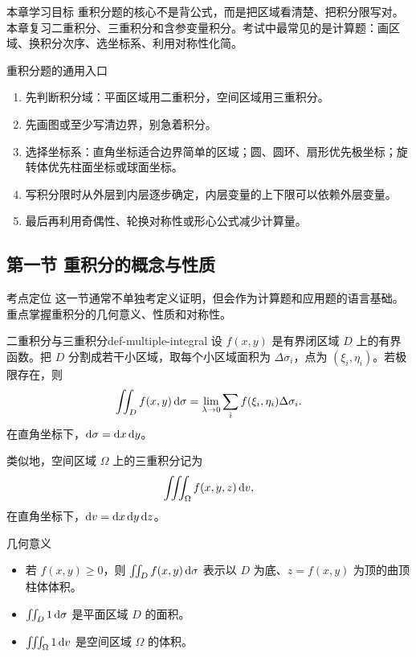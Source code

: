 
\begin{summarybox}{本章学习目标}
重积分题的核心不是背公式，而是把区域看清楚、把积分限写对。本章复习二重积分、三重积分和含参变量积分。考试中最常见的是计算题：画区域、换积分次序、选坐标系、利用对称性化简。
\end{summarybox}

\begin{methodbox}{重积分题的通用入口}
\begin{enumerate}
  \item 先判断积分域：平面区域用二重积分，空间区域用三重积分。
  \item 先画图或至少写清边界，别急着积分。
  \item 选择坐标系：直角坐标适合边界简单的区域；圆、圆环、扇形优先极坐标；旋转体优先柱面坐标或球面坐标。
  \item 写积分限时从外层到内层逐步确定，内层变量的上下限可以依赖外层变量。
  \item 最后再利用奇偶性、轮换对称性或形心公式减少计算量。
\end{enumerate}
\end{methodbox}

\subsection{第一节 重积分的概念与性质}

\begin{summarybox}{考点定位}
这一节通常不单独考定义证明，但会作为计算题和应用题的语言基础。重点掌握重积分的几何意义、性质和对称性。
\end{summarybox}

\begin{dy}{二重积分与三重积分}{def-multiple-integral}
设 $f(x,y)$ 是有界闭区域 $D$ 上的有界函数。把 $D$ 分割成若干小区域，取每个小区域面积为 $\Delta\sigma_i$，点为 $(\xi_i,\eta_i)$。若极限存在，则
\[
  \iint_D f(x,y)\mathop{}\!\mathrm{d}\sigma
  =\lim_{\lambda\to0}\sum_i f(\xi_i,\eta_i)\Delta\sigma_i.
\]
在直角坐标下，$\mathop{}\!\mathrm{d}\sigma=\mathop{}\!\mathrm{d} x\mathop{}\!\mathrm{d} y$。

类似地，空间区域 $\Omega$ 上的三重积分记为
\[
  \iiint_\Omega f(x,y,z)\mathop{}\!\mathrm{d} v,
\]
在直角坐标下，$\mathop{}\!\mathrm{d} v=\mathop{}\!\mathrm{d} x\mathop{}\!\mathrm{d} y\mathop{}\!\mathrm{d} z$。
\end{dy}

\begin{summarybox}{几何意义}
\begin{itemize}
  \item 若 $f(x,y)\ge0$，则 $\iint_D f(x,y)\mathop{}\!\mathrm{d}\sigma$ 表示以 $D$ 为底、$z=f(x,y)$ 为顶的曲顶柱体体积。
  \item $\iint_D 1\mathop{}\!\mathrm{d}\sigma$ 是平面区域 $D$ 的面积。
  \item $\iiint_\Omega 1\mathop{}\!\mathrm{d} v$ 是空间区域 $\Omega$ 的体积。
\end{itemize}
\end{summarybox}

